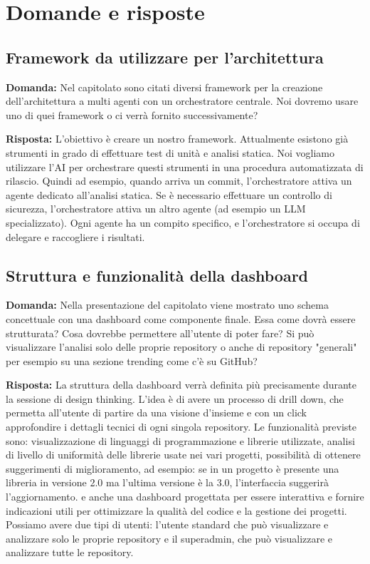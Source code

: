 \documentclass[a4paper,12pt]{article}
\begin{document}
\section{Domande e risposte}{

    \subsection{Framework da utilizzare per l'architettura}
    \textbf{Domanda:} Nel capitolato sono citati diversi framework per la creazione dell'architettura a multi agenti con un orchestratore centrale. Noi dovremo usare uno di quei framework o ci verrà fornito successivamente?

    \textbf{Risposta:} L'obiettivo è creare un nostro framework. Attualmente esistono già strumenti in grado di effettuare test di unità e analisi statica. Noi vogliamo utilizzare l'AI per orchestrare questi strumenti in una procedura automatizzata di rilascio. Quindi ad esempio, quando arriva un commit, l'orchestratore attiva un agente dedicato all'analisi statica. Se è necessario effettuare un controllo di sicurezza, l'orchestratore attiva un altro agente (ad esempio un LLM specializzato). Ogni agente ha un compito specifico, e l'orchestratore si occupa di delegare e raccogliere i risultati.

    \subsection{Struttura e funzionalità della dashboard}
    \textbf{Domanda:} Nella presentazione del capitolato viene mostrato uno schema concettuale con una dashboard come componente finale. Essa come dovrà essere strutturata? Cosa dovrebbe permettere all'utente di poter fare? Si può visualizzare l'analisi solo delle proprie repository o anche di repository "generali" per esempio su una sezione trending come c'è su GitHub?

    \textbf{Risposta:} La struttura della dashboard verrà definita più precisamente durante la sessione di design thinking. L'idea è di avere un processo di drill down, che permetta all'utente di partire da una visione d'insieme e con un click approfondire i dettagli tecnici di ogni singola repository. Le funzionalità previste sono: visualizzazione di linguaggi di programmazione e librerie utilizzate, analisi di livello di uniformità delle librerie usate nei vari progetti, possibilità di ottenere suggerimenti di miglioramento, ad esempio: se in un progetto è presente una libreria in versione 2.0 ma l'ultima versione è la 3.0, l'interfaccia suggerirà l'aggiornamento. e anche una dashboard progettata per essere interattiva e fornire indicazioni utili per ottimizzare la qualità del codice e la gestione dei progetti. Possiamo avere due tipi di utenti: l'utente standard che può visualizzare e analizzare solo le proprie repository e il superadmin, che può visualizzare e analizzare tutte le repository.

}
\end{document}
